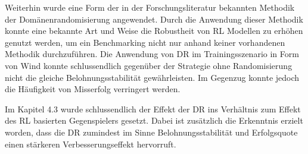 Weiterhin wurde eine Form der in der Forschungsliteratur bekannten Methodik der Domänenrandomisierung angewendet. 
Durch die Anwendung dieser Methodik konnte eine bekannte Art und Weise die Robustheit von RL Modellen zu erhöhen genutzt werden, um ein Benchmarking nicht nur anhand keiner vorhandenen Methodik durchzuführen.
Die Anwendung von DR im Trainingsszenario in Form von Wind konnte schlussendlich gegenüber der Strategie ohne Randomisierung nicht die gleiche Belohnungsstabilität gewährleisten.
Im Gegenzug konnte jedoch die Häufigkeit von Misserfolg verringert werden.

Im Kapitel 4.3 wurde schlussendlich der Effekt der DR ins Verhältnis zum Effekt des RL basierten Gegenspielers gesetzt.
Dabei ist zusätzlich die Erkenntnis erzielt worden, dass die DR zumindest im Sinne Belohnungsstabilität und Erfolgsquote einen stärkeren Verbesserungseffekt hervorruft. %